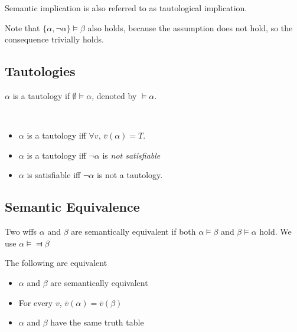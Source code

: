 Semantic implication is also referred to as tautological implication.

\begin{remark}
    Note that $\{\alpha,\neg\alpha\} \vDash \beta$ also holds, because the assumption does not hold, so the consequence trivially holds.
\end{remark}

\subsection{Tautologies}
\label{sub:Tautologies}

\begin{definition}[Tautologies]
    \label{def:Tautology}
    $\alpha$ is a tautology if $\emptyset \vDash \alpha$, denoted by $\vDash \alpha$.
\end{definition}
\begin{remark}
    ~{}
    \begin{itemize}
        \item $\alpha$ is a tautology iff $\forall v$, $\bar{v}(\alpha)=T$.
        \item $\alpha$ is a tautology iff $\neg \alpha$ is \emph{not satisfiable}
        \item $\alpha$ is satisfiable iff $\neg \alpha$ is not a tautology.
    \end{itemize}
\end{remark}

\subsection{Semantic Equivalence}
\label{sub:SemanticEquivalence}

\begin{definition}
    Two wffs $\alpha$ and $\beta$ are semantically equivalent if both $\alpha\vDash\beta$ and $\beta\vDash\alpha$ hold. We use $\alpha\vDash\Dashv\beta$
\end{definition}

\begin{proposition}
    The following are equivalent
    \begin{itemize}
        \item $\alpha$ and $\beta$ are semantically equivalent
        \item For every $v$, $\bar{v}(\alpha)=\bar{v}(\beta)$
        \item $\alpha$ and $\beta$ have the same truth table
    \end{itemize}
\end{proposition}

